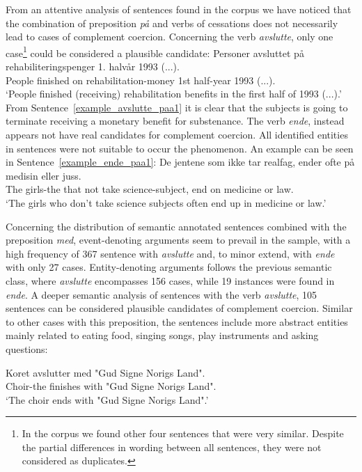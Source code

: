 \documentclass{article}
\begin{document}
From an attentive analysis of sentences found in the corpus we have noticed that the combination of preposition \emph{på} and verbs of cessations does not necessarily lead to cases of complement coercion. Concerning the verb \emph{avslutte}, only one case\footnote{In the corpus we found other four sentences that were very similar. Despite the partial differences in wording between all sentences, they were not considered as duplicates.} could be considered a plausible candidate:
    \ea \label{example_avslutte_paa1} %
    \gll Personer avsluttet på rehabiliteringspenger 1. halvår 1993 (...).\\
         People finished on rehabilitation-money 1st half-year 1993 (...).\\
    \glt ‘People finished (receiving) rehabilitation benefits in the first half of 1993 (...).’
    \z
\noindent From Sentence~\ref{example_avslutte_paa1} it is clear that the subjects is going to terminate receiving a monetary benefit for substenance. 
The verb \emph{ende}, instead appears not have real candidates for complement coercion. All identified entities in sentences were not suitable to occur the phenomenon. An example can be seen in Sentence~\ref{example_ende_paa1}:
    \ea \label{example_ende_paa1} %
    \gll De jentene som ikke tar realfag, ender ofte på medisin eller juss.\\
    The girls-the that not take science-subject, end on medicine or law.\\
    \glt ‘The girls who don't take science subjects often end up in medicine or law.’
    \z
    
Concerning the distribution of semantic annotated sentences combined with the preposition \emph{med}, event-denoting arguments seem to prevail in the sample, with a high frequency of 367 sentence with \emph{avslutte} and, to minor extend, with \emph{ende} with only 27 cases. Entity-denoting arguments follows the previous semantic class, where \emph{avslutte} encompasses 156 cases, while 19 instances were found in \emph{ende}.  
A deeper semantic analysis of sentences with the verb \emph{avslutte}, 105 sentences can be considered plausible candidates of complement coercion. Similar to other cases with this preposition, the sentences include more abstract entities mainly related to eating food, singing songs, play instruments and asking questions:

    \ea \label{example_avslutte_med1} %
    \gll Koret avslutter med "Gud Signe Norigs Land".\\
    Choir-the finishes with "Gud Signe Norigs Land".\\
    \glt ‘The choir ends with "Gud Signe Norigs Land".’
    \z 
\end{document}
